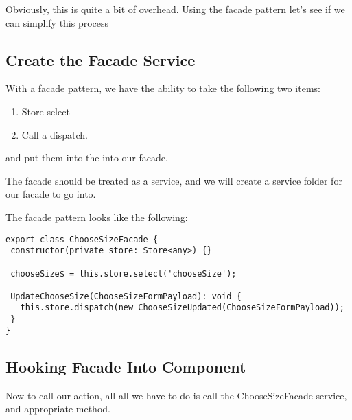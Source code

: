 Obviously, this is quite a bit of overhead. Using the facade pattern let's see
if we can simplify this process

\subsection{ Create the Facade Service  }

With a facade pattern, we have the ability to take the following two items:
\begin{enumerate}
  \item Store select
  \item Call a dispatch.
\end{enumerate}

and put them into the into our facade.

The facade should be treated as a service, and we will create a service folder
for our facade to go into.

The facade pattern looks like the following:
\begin{lstlisting}
export class ChooseSizeFacade {
 constructor(private store: Store<any>) {}

 chooseSize$ = this.store.select('chooseSize');

 UpdateChooseSize(ChooseSizeFormPayload): void {
   this.store.dispatch(new ChooseSizeUpdated(ChooseSizeFormPayload));
 }
}
\end{lstlisting}

\subsection{ Hooking Facade Into Component }
Now to call our action, all all we have to do is call the ChooseSizeFacade
service, and appropriate method.

